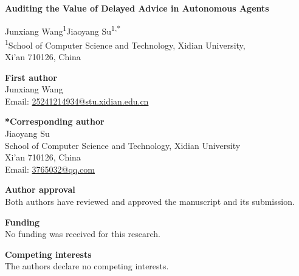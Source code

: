 \documentclass[11pt,a4paper]{article}
\begin{document}
\begin{center}
{\Large\bfseries Auditing the Value of Delayed Advice in Autonomous Agents\par}
\vspace{12pt}
Junxiang Wang\textsuperscript{1}\quad Jiaoyang Su\textsuperscript{1,*}\\[8pt]
\textsuperscript{1}School of Computer Science and Technology, Xidian University,\\
Xi'an 710126, China
\end{center}
\vspace{12pt}
\textbf{First author}\\
Junxiang Wang\\
Email: \href{mailto:25241214934@stu.xidian.edu.cn}{25241214934@stu.xidian.edu.cn}

\textbf{*Corresponding author}\\
Jiaoyang Su\\
School of Computer Science and Technology, Xidian University\\
Xi'an 710126, China\\
Email: \href{mailto:3765032@qq.com}{3765032@qq.com}

\textbf{Author approval}\\
Both authors have reviewed and approved the manuscript and its submission.

\textbf{Funding}\\
No funding was received for this research.

\textbf{Competing interests}\\
The authors declare no competing interests.
\end{document}
